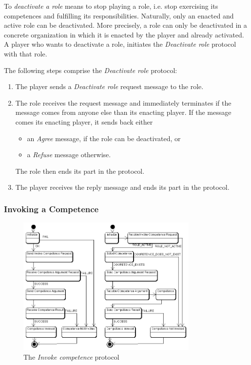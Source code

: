 To \textit{deactivate a role} means to stop playing a role, i.e. stop exercising its competences and fulfilling its responsibilities.
Naturally, only an enacted and active role can be deactivated.
More precisely, a role can only be deactivated in a concrete organization in which it is enacted by the player and already activated.
A player who wants to deactivate a role, initiates the \textit{Deactivate role} protocol with that role.

The following steps comprise the \textit{Deactivate role} protocol:
\begin{enumerate}
	\item The player sends a \textit{Deactivate role} request message to the role.
	\item The role receives the request message and immediately terminates if the message comes from anyone else than its enacting player.
	If the message comes its enacting player, it sends back either
	\begin{itemize}
		\item an \textit{Agree} message, if the role can be deactivated, or
		\item a \textit{Refuse} message otherwise.
	\end{itemize}
	The role then ends its part in the protocol.
	\item The player receives the reply message and ends its part in the protocol.
\end{enumerate}

\subsubsection{Invoking a Competence}

\begin{figure}[ht]
	\centering
	\includegraphics[width=0.8\textwidth]{images/thespian/invoke-competence-protocol.png}
	\caption{The \textit{Invoke competence} protocol}
	\label{figure:thespian-invoke-competence-protocol}
\end{figure}

